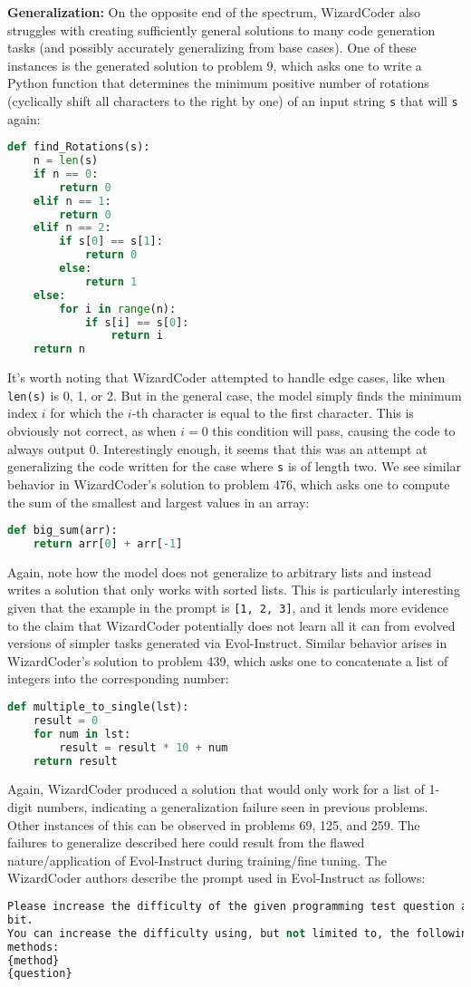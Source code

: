 \documentclass[10pt]{article}
\newcommand{\code}[1]{\texttt{#1}}
\theoremstyle{definition}
\begin{document}
\noindent\textbf{Generalization:} On the opposite end of the spectrum, WizardCoder also struggles with creating sufficiently general solutions to many code generation tasks (and possibly accurately generalizing from base cases). One of these instances is the generated solution to problem 9, which asks one to write a Python function that determines the minimum positive number of rotations (cyclically shift all characters to the right by one) of an input string \code{s} that will \code{s} again:
\begin{lstlisting}[language=Python]
def find_Rotations(s):
    n = len(s)
    if n == 0:
        return 0
    elif n == 1:
        return 0
    elif n == 2:
        if s[0] == s[1]:
            return 0
        else:
            return 1
    else:
        for i in range(n):
            if s[i] == s[0]:
                return i
    return n
\end{lstlisting}
\noindent It's worth noting that WizardCoder attempted to handle edge cases, like when \code{len(s)} is 0, 1, or 2. But in the general case, the model simply finds the minimum index $i$ for which the $i$-th character is equal to the first character. This is obviously not correct, as when $i=0$ this condition will pass, causing the code to always output 0. Interestingly enough, it seems that this was an attempt at generalizing the code written for the case where \code{s} is of length two. We see similar behavior in WizardCoder's solution to problem 476, which asks one to compute the sum of the smallest and largest values in an array:
\begin{lstlisting}[language=Python]
def big_sum(arr):
    return arr[0] + arr[-1]
\end{lstlisting}
\noindent Again, note how the model does not generalize to arbitrary lists and instead writes a solution that only works with sorted lists. This is particularly interesting given that the example in the prompt is \code{[1, 2, 3]}, and it lends more evidence to the claim that WizardCoder potentially does not learn all it can from evolved versions of simpler tasks generated via Evol-Instruct. Similar behavior arises in WizardCoder's solution to problem 439, which asks one to concatenate a list of integers into the corresponding number:
\begin{lstlisting}[language=Python]
def multiple_to_single(lst):
    result = 0
    for num in lst:
        result = result * 10 + num
    return result
\end{lstlisting}
\noindent Again, WizardCoder produced a solution that would only work for a list of 1-digit numbers, indicating a generalization failure seen in previous problems. Other instances of this can be observed in problems 69, 125, and 259.
\noindent The failures to generalize described here could result from the flawed nature/application of Evol-Instruct during training/fine tuning. The WizardCoder authors describe the prompt used in Evol-Instruct as follows:
\begin{lstlisting}[language=Python]
Please increase the difficulty of the given programming test question a
bit.
You can increase the difficulty using, but not limited to, the following
methods:
{method}
{question}
\end{lstlisting}
\end{document}
